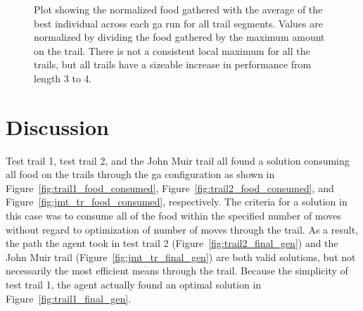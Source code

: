 \begin{figure}[hbt]
\centering
{}
\caption[Mean Food Gathered on All Segments with Varying Delay Line Length]{Plot showing the normalized food gathered with the average of the best individual across each \gls{ga} run for all trail segments. Values are normalized by dividing the food gathered by the maximum amount on the trail. There is not a consistent local maximum for all the trails, but all trails have a sizeable increase in performance from length 3 to 4.}
\label{fig:sft_all_sweep_no_std}
\end{figure}


\clearpage
\section{Discussion}
Test trail 1, test trail 2, and the John Muir trail all found a solution consuming all food on the trails through the \gls{ga} configuration as shown in Figure~\ref{fig:trail1_food_consumed}, Figure~\ref{fig:trail2_food_consumed}, and Figure~\ref{fig:jmt_tr_food_consumed}, respectively. The criteria for a solution in this case was to consume all of the food within the specified number of moves without regard to optimization of number of moves through the trail. As a result, the path the agent took in test trail 2 (Figure~\ref{fig:trail2_final_gen}) and the John Muir trail (Figure~\ref{fig:jmt_tr_final_gen}) are both valid solutions, but not necessarily the most efficient means through the trail. Because the simplicity of test trail 1, the agent actually found an optimal solution in Figure~\ref{fig:trail1_final_gen}.

